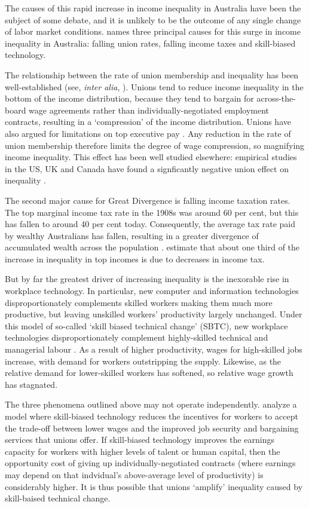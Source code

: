 The causes of this rapid increase in income inequality in Australia have been the subject of some debate, and it is unlikely to be the outcome of any single change of labor market conditions. \citet{Leigh2013} names three principal causes for this surge in income inequality in Australia: falling union rates, falling income taxes and skill-biased technology. 

The relationship between the rate of union membership and inequality has been well-established (see, {\em inter alia}, \cite{Borland1996}).  Unions tend to reduce income inequality in the bottom of the income distribution, because they tend to bargain for across-the-board wage agreements rather than individually-negotiated employment contracts, resulting in a `compression' of the income distribution. Unions have also argued for limitations on top executive pay \citep{Davis2009}. Any reduction in the rate of union membership therefore limits the degree of wage compression, so magnifying income inequality. This effect has been well studied elsewhere: empirical studies in the US, UK and Canada have found a signficantly negative union effect on inequality \citet{Card2004,Firpo2009}. 

The second major cause for Great Divergence is falling income taxation rates. The top marginal income tax rate in the 1908s was around 60 per cent, but this has fallen to around 40 per cent today. Consequently, the average tax rate paid by wealthy Australians has fallen, resulting in a greater divergence of accumulated wealth across the population \citet[p31]{Leigh2013}. \citet{Atkinson2013} estimate that about one third of the increase in inequality in top incomes is due to decreases in income tax.

But by far the greatest driver of increasing inequality is the inexorable rise in workplace technology. In particular, new computer and information technologies disproportionately complements skilled workers making them much more productive, but leaving unskilled workers' productivity largely unchanged. Under this model of so-called `skill biased technical change' (SBTC), new workplace technologies disproportionately complement highly-skilled technical and managerial labour \citep{Griliches1969,Autor2006}. As a result of higher productivity, wages for high-skilled jobs increase, with demand for workers outstripping the supply. Likewise, as the relative demand for lower-skilled workers has softened, so relative wage growth has stagnated. 

The three phenomena outlined above may not operate independently. \citet{Acemoglu2003} analyze a model where skill-biased technology reduces the incentives for workers to accept the trade-off between lower wages and the improved job security and bargaining services that unions offer. If skill-biased technology improves the earnings capacity for workers with higher levels of talent or human capital, then the opportunity cost of giving up individually-negotiated contracts (where earnings may depend on that indvidual's above-average level of productivity) is considerably higher. It is thus possible that unions `amplify' inequality caused by skill-baised technical change.

